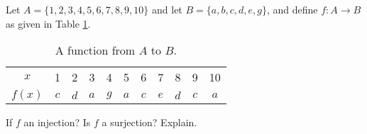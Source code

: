 \begin{comment}
\item From the previous part we know that $g(x) \neq 3$ for every $x$, so $g$ maps into $\R \setminus \{3\}$. Suppose $x_1, x_2 \in \R \setminus \{4\}$ with $g(x_1) = g(x_2)$. Then 
\begin{align*}
\frac{3x_1}{x_1 - 4} &=  \frac{3x_2}{x_2 - 4} \\
3x_1(x_2-4) &=  3x_2(x_1-4) \\
3x_1x_2 - 12x_1 &= 3x_1x_2 - 12x_2 \\
-12x_1 &= -12x_2 \\
x_1 &= x_2.
\end{align*}
So $g$ is an injection. 

To show that $g$ is a surjection, let $y \in \R \setminus \{3\}$. Let $x = \frac{4y}{y-3}$. Then 
\[g(y) = \frac{3\frac{4y}{y-3}}{\frac{4y}{y-3} - 4} = \frac{12y}{4y - 4(y-3)} = \frac{12y}{12} = y.\]
Thus, $g$ is a surjection and also a bijection.   

\item Since $h(-1) = 1 = h(1)$, we conclude that $h$ is not an injection. To show that $h$ is a surjection, let $y \in \R_{\geq 0}$. Then $\sqrt{y} \in \R$ and $h(\sqrt{y}) = y$. Thus, $h$ is surjection but not a bijection. 

\item Different from the previous part, we will show that $k$ is an injection. Let $x_1, x_2 \in \R_{\geq 0}$ and assume that $k(x_1) = k(x_2)$. Then $x_1^2 = x_2^2$. The fact that neither $x_1$ nor $x_2$ is negative implies that $x_1 = x_2$ and $k$ is an injection. To show that $k$ is a surjection, let $y \in \R_{\geq 0}$. Then $\sqrt{y} \in \R_{\geq 0}$ and $k(\sqrt{y}) = y$. Thus, $k$ is surjection and a bijection.  $k: \R_{\geq 0} \to \R_{\geq 0}$ defined by $k(x) = x^2$ for every $x \in \R_{\geq 0}$


\ea


\end{comment}



\item Let $A = \{1,2,3,4,5,6,7,8,9,10\}$ and let $B = \{a,b,c,d,e,g\}$, and define $f:A \to B$ as given in Table \ref{T:Sec_2_fn_example}.
\begin{table}[h]
\begin{center}
\begin{tabular}{c|cccccccccc}
$x$	&1&2&3&4&5&6&7&8&9&10 \\
$f(x)$ &$c$&$d$&$a$&$g$&$a$&$c$&$e$&$d$&$c$&$a$ 
\end{tabular}
\caption{A function from $A$ to $B$.}
\label{T:Sec_2_fn_example}
\end{center}
\end{table}
	\ba
	\item If $f$ an injection? Is $f$ a surjection? Explain.
	
